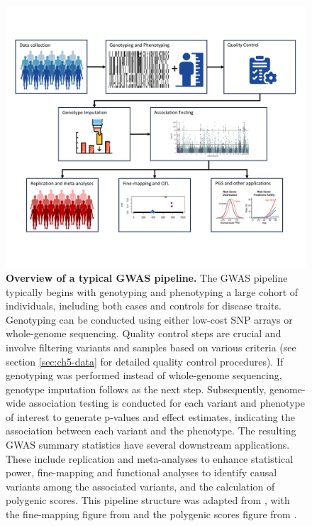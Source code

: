 \begin{figure}[h!]
    \centering
    \includegraphics[width=\textwidth]{figures/thesis_qd_gwas_pipeline.png}
    \caption{
    \textbf{Overview of a typical GWAS pipeline.} The GWAS pipeline typically begins with genotyping and phenotyping a large cohort of individuals, including both cases and controls for disease traits. Genotyping can be conducted using either low-cost SNP arrays or whole-genome sequencing. Quality control steps are crucial and involve filtering variants and samples based on various criteria (see section \ref{sec:ch5-data} for detailed quality control procedures). If genotyping was performed instead of whole-genome sequencing, genotype imputation follows as the next step. Subsequently, genome-wide association testing is conducted for each variant and phenotype of interest to generate p-values and effect estimates, indicating the association between each variant and the phenotype. The resulting GWAS summary statistics have several downstream applications. These include replication and meta-analyses to enhance statistical power, fine-mapping and functional analyses to identify causal variants among the associated variants, and the calculation of polygenic scores. This pipeline structure was adapted from \cite{uffelmann2021genome}, with the fine-mapping figure from \cite{Wang} and the polygenic scores figure from \cite{wand2021improving}.
    }
    \label{fig:qd-intro}
\end{figure}

